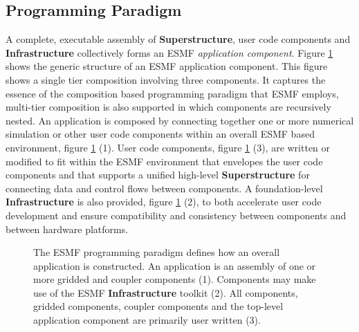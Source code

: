 \subsection{Programming Paradigm}
A complete, executable assembly of {\bf Superstructure}, user code components and {\bf Infrastructure} collectively forms an ESMF {\it application component}.
Figure \ref{fig:ESMFApplication} shows the generic structure of an ESMF application component. 
This figure shows a single tier composition involving three components. It captures the essence of the composition based programming paradigm that 
ESMF employs, multi-tier composition is also supported in which components are recursively nested.
An application is composed by connecting together one or more
numerical simulation or other user code components within an overall ESMF based environment, figure \ref{fig:ESMFApplication} (1). User code components, figure \ref{fig:ESMFApplication} (3), are written
or modified to fit within the ESMF environment that envelopes
the user code components and that supports a unified high-level {\bf Superstructure} for connecting data and control flows between 
components. A foundation-level {\bf Infrastructure} is also provided, figure \ref{fig:ESMFApplication} (2),
to both accelerate user code development and ensure compatibility
and consistency between components and between hardware platforms. 
\begin{figure}
\caption{The ESMF programming paradigm defines how an overall application is constructed. An application is an assembly
of one or more gridded and coupler components (1). Components may make use of the ESMF {\bf Infrastructure} toolkit (2). All components,
gridded components, coupler components and the top-level application component are primarily user written (3).}
\label{fig:ESMFApplication}
\end{figure}

